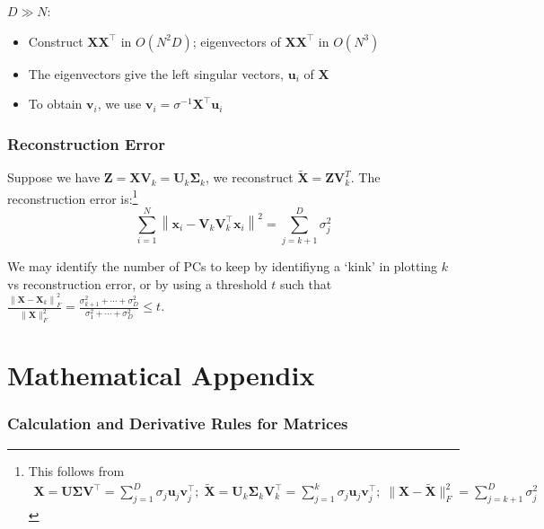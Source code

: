 \documentclass[11pt, %
	oneside, %
	english, %
	onehalfspacing, %
	parskip, %
	]{article} %
\theoremstyle{definition}
\begin{document}
$D \gg N$:

\begin{itemize}
	\item Construct $\mathbf{X X}^{\top}$ in $O\left(N^2 D\right)$; eigenvectors of $\mathbf{X} \mathbf{X}^{\top}$ in $O\left(N^3\right)$
	\item The eigenvectors give the left singular vectors, $\mathbf{u}_i$ of $\mathbf{X}$
	\item To obtain $\mathbf{v}_i$, we use $\mathbf{v}_i=\sigma^{-1} \mathbf{X}^{\top} \mathbf{u}_i$
\end{itemize}


\subsubsection*{Reconstruction Error}

Suppose we have $\mathbf{Z}=\mathbf{X} \mathbf{V}_k=\mathbf{U}_k \boldsymbol{\Sigma}_k$, we reconstruct $\mathbf{\tilde{X}} = \mathbf{Z} \mathbf{V}_k^T$. The reconstruction error is:\footnote{This follows from
\begin{equation*}
	\begin{aligned}
		\mathbf{X}=\mathbf{U} \boldsymbol{\Sigma} \mathbf{V}^{\top}=\sum_{j=1}^D \sigma_j \mathbf{u}_j \mathbf{v}_j^{\top}; \; \tilde{\mathbf{X}}=\mathbf{U}_k \boldsymbol{\Sigma}_k \mathbf{V}_k^{\top}=\sum_{j=1}^k \sigma_j \mathbf{u}_j \mathbf{v}_j^{\top}; \; \|\mathbf{X}-\tilde{\mathbf{X}}\|_F^2=\sum_{j=k+1}^D \sigma_j^2
	\end{aligned}
\end{equation*}
}
\begin{equation*}
	\sum_{i=1}^N\left\|\mathbf{x}_i-\mathbf{V}_k \mathbf{V}_k^{\top} \mathbf{x}_i\right\|^2=\sum_{j=k+1}^D \sigma_j^2
\end{equation*}

We may identify the number of PCs to keep by identifiyng a `kink' in plotting $k$ vs reconstruction error, or by using a threshold $t$ such that $\frac{\left\|\mathbf{X}-\mathbf{X}_k\right\|_F^2}{\|\mathbf{X}\|_F^2}=\frac{\sigma_{k+1}^2+\cdots+\sigma_D^2}{\sigma_1^2+\cdots+\sigma_D^2} \leq t$.


\clearpage


\appendix

\section{Mathematical Appendix}

\subsubsection*{Calculation and Derivative Rules for Matrices}
\end{document}
